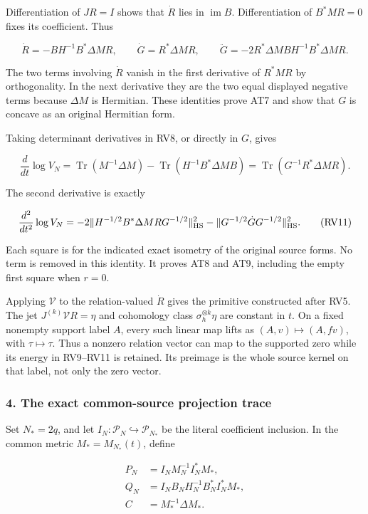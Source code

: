 Differentiation of \(JR=I\) shows that \(\dot R\) lies in \(\operatorname{im}B\). Differentiation of \(B^*MR=0\) fixes its coefficient. Thus

\[
\dot R=-BH^{-1}B^*\Delta M R,\qquad
\dot G=R^*\Delta M R,\qquad
\ddot G=-2R^*\Delta M BH^{-1}B^*\Delta M R.
\tag{RV9}
\]

The two terms involving \(\dot R\) vanish in the first derivative of \(R^*MR\) by orthogonality. In the next derivative they are the two equal displayed negative terms because \(\Delta M\) is Hermitian. These identities prove AT7 and show that \(G\) is concave as an original Hermitian form.

Taking determinant derivatives in RV8, or directly in \(G\), gives

\[
\frac d{dt}\log V_N
=\operatorname{Tr}(M^{-1}\Delta M)
-\operatorname{Tr}(H^{-1}B^*\Delta MB)
=\operatorname{Tr}(G^{-1}R^*\Delta MR).
\tag{RV10}
\]

The second derivative is exactly

\[
\frac {d^2}{dt^2}\log V_N
=-2\|H^{-1/2}B^*\Delta MR G^{-1/2}\|_{\rm HS}^2
-\|G^{-1/2}\dot G G^{-1/2}\|_{\rm HS}^2.
\tag{RV11}
\]

Each square is for the indicated exact isometry of the original source forms. No term is removed in this identity. It proves AT8 and AT9, including the empty first square when \(r=0\).

Applying \(\mathcal V\) to the relation-valued \(\dot R\) gives the primitive constructed after RV5. The jet \(J^{(k)}\mathcal V R=\eta\) and cohomology class \(\sigma_h^{\otimes k}\eta\) are constant in \(t\). On a fixed nonempty support label \(A\), every such linear map lifts as \((A,v)\mapsto(A,fv)\), with \(\tau\mapsto\tau\). Thus a nonzero relation vector can map to the supported zero while its energy in RV9--RV11 is retained. Its preimage is the whole source kernel on that label, not only the zero vector.

\subsubsection{4. The exact common-source projection trace}\label{endpoint-determinant_review--the-exact-common-source-projection-trace}

Set \(N_*=2q\), and let \(I_N:\mathcal P_N\hookrightarrow\mathcal P_{N_*}\) be the literal coefficient inclusion. In the common metric \(M_*=M_{N_*}(t)\), define

\[
\begin{aligned}
P_N&=I_NM_N^{-1}I_N^*M_*,\\
Q_N&=I_NB_NH_N^{-1}B_N^*I_N^*M_*,\\
C&=M_*^{-1}\Delta M_*.
\end{aligned}
\tag{RV12}
\]

